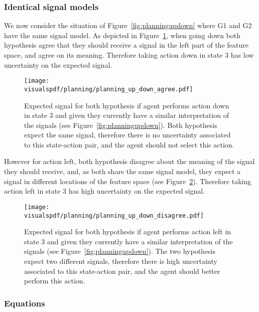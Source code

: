 \subsubsection*{Identical signal models}

We now consider the situation of Figure~\ref{fig:planningupdown} where G1 and G2 have the same signal model. As depicted in Figure~\ref{fig:uncertaintysignalupdownagree}, when going down both hypothesis agree that they should receive a signal in the left part of the feature space, and agree on its meaning. Therefore taking action down in state 3 has low uncertainty on the expected signal.

\begin{figure}[!p]
  \centering
  \texttt{[image: \\visualspdf/planning/planning\_up\_down\_agree.pdf]}
  \caption{Expected signal for both hypothesis if agent performs action down in state 3 and given they currently have a similar interpretation of the signals (see Figure~\ref{fig:planningupdown}). Both hypothesis expect the same signal, therefore there is no uncertainty associated to this state-action pair, and the agent should not select this action.}
  \label{fig:uncertaintysignalupdownagree}
\end{figure}

However for action left, both hypothesis disagree about the meaning of the signal they should receive, and, as both share the same signal model, they expect a signal in different locations of the feature space (see Figure~\ref{fig:uncertaintysignalupdowndisagree}). Therefore taking action left in state 3 has high uncertainty on the expected signal.

\begin{figure}[!p]
  \centering
  \texttt{[image: \\visualspdf/planning/planning\_up\_down\_disagree.pdf]}
  \caption{Expected signal for both hypothesis if agent performs action left in state 3 and given they currently have a similar interpretation of the signals (see Figure~\ref{fig:planningupdown}). The two hypothesis expect two different signals, therefore there is high uncertainty associated to this state-action pair, and the agent should better perform this action.}
  \label{fig:uncertaintysignalupdowndisagree}
\end{figure}


\visuopti{\newpage}


\subsubsection*{Equations}

